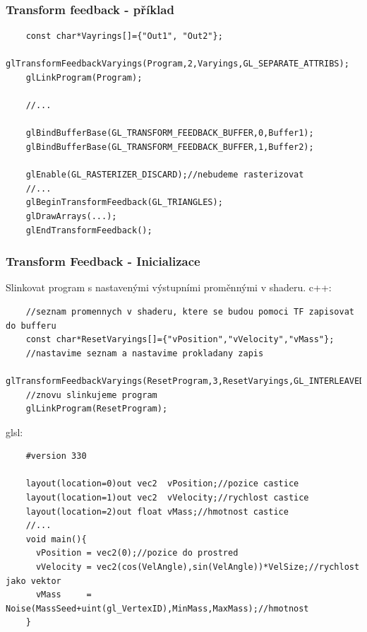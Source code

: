 \begin{frame}[fragile]
\frametitle{Transform feedback - příklad}
	{\scriptsize
	\begin{verbatim}
	const char*Vayrings[]={"Out1", "Out2"};
	glTransformFeedbackVaryings(Program,2,Varyings,GL_SEPARATE_ATTRIBS);
	glLinkProgram(Program);

	//...

	glBindBufferBase(GL_TRANSFORM_FEEDBACK_BUFFER,0,Buffer1);
	glBindBufferBase(GL_TRANSFORM_FEEDBACK_BUFFER,1,Buffer2);
	
	glEnable(GL_RASTERIZER_DISCARD);//nebudeme rasterizovat
	//...
	glBeginTransformFeedback(GL_TRIANGLES);
	glDrawArrays(...);
	glEndTransformFeedback();
	\end{verbatim}
	}
\end{frame}

\begin{frame}[fragile]
\frametitle{Transform Feedback - Inicializace}
	Slinkovat program s nastavenými výstupními proměnnými v shaderu.
	c++:
	{\scriptsize
	\begin{verbatim}
	//seznam promennych v shaderu, ktere se budou pomoci TF zapisovat do bufferu
	const char*ResetVaryings[]={"vPosition","vVelocity","vMass"};
	//nastavime seznam a nastavime prokladany zapis
	glTransformFeedbackVaryings(ResetProgram,3,ResetVaryings,GL_INTERLEAVED_ATTRIBS);
	//znovu slinkujeme program
	glLinkProgram(ResetProgram);
	\end{verbatim}
	}
	glsl:
	{\scriptsize
	\begin{verbatim}
	#version 330

	layout(location=0)out vec2  vPosition;//pozice castice
	layout(location=1)out vec2  vVelocity;//rychlost castice
	layout(location=2)out float vMass;//hmotnost castice
	//...
	void main(){
	  vPosition = vec2(0);//pozice do prostred
	  vVelocity = vec2(cos(VelAngle),sin(VelAngle))*VelSize;//rychlost jako vektor
	  vMass     = Noise(MassSeed+uint(gl_VertexID),MinMass,MaxMass);//hmotnost
	}
	\end{verbatim}
	}
\end{frame}

